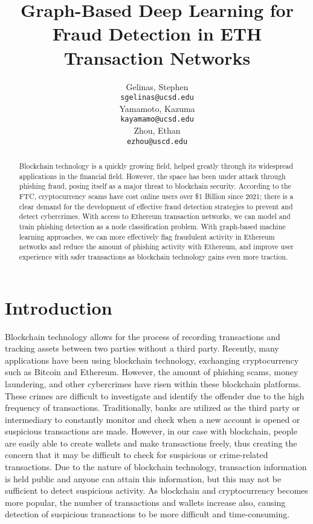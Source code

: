 \documentclass{article}
\title{Graph-Based Deep Learning for Fraud Detection in ETH Transaction Networks}
\author{
  Gelinas, Stephen \\
  \texttt{sgelinas@ucsd.edu} \\
  \And
  Yamamoto, Kazuma \\
   \texttt{kayamamo@ucsd.edu} \\
  \And
  Zhou, Ethan \\
  \texttt{ezhou@uscd.edu} \\
}
\begin{document}
\maketitle


\begin{abstract}
 	Blockchain technology is a quickly growing field, helped greatly through its widespread applications in the financial field. However, the space has been under attack through phishing fraud, posing itself as a major threat to blockchain security. According to the FTC, cryptocurrency scams have cost online users over \$1 Billion since 2021; there is a clear demand for the development of effective fraud detection strategies to prevent and detect cybercrimes. With access to Ethereum transaction networks, we can model and train phishing detection as a node classification problem. With graph-based machine learning approaches, we can more effectively flag fraudulent activity in Ethereum networks and reduce the amount of phishing activity with Ethereum, and improve user experience with safer transactions as blockchain technology gains even more traction.
\end{abstract}


\section{Introduction}
	Blockchain technology allows for the process of recording transactions and tracking assets between two parties without a third party. Recently, many applications have been using blockchain technology, exchanging cryptocurrency such as Bitcoin and Ethereum. However, the amount of phishing scams, money laundering, and other cybercrimes have risen within these blockchain platforms. These crimes are difficult to investigate and identify the offender due to the high frequency of transactions. Traditionally, banks are utilized as the third party or intermediary to constantly monitor and check when a new account is opened or suspicious transactions are made. However, in our case with blockchain, people are easily able to create wallets and make transactions freely, thus creating the concern that it may be difficult to check for suspicious or crime-related transactions. Due to the nature of blockchain technology, transaction information is held public and anyone can attain this information, but this may not be sufficient to detect suspicious activity. As blockchain and cryptocurrency becomes more popular, the number of transactions and wallets increase also, causing detection of suspicious transactions to be more difficult and time-consuming.  
\end{document}
